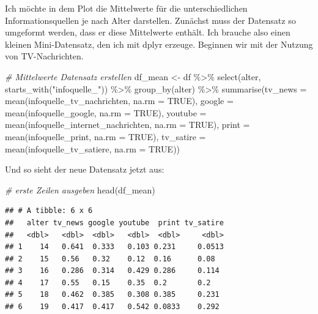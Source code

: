 \documentclass[
]{book}
\newenvironment{Shaded}{\begin{snugshade}}{\end{snugshade}}
\newcommand{\AttributeTok}[1]{\textcolor[rgb]{0.77,0.63,0.00}{#1}}
\newcommand{\CommentTok}[1]{\textcolor[rgb]{0.56,0.35,0.01}{\textit{#1}}}
\newcommand{\ConstantTok}[1]{\textcolor[rgb]{0.00,0.00,0.00}{#1}}
\newcommand{\FunctionTok}[1]{\textcolor[rgb]{0.00,0.00,0.00}{#1}}
\newcommand{\NormalTok}[1]{#1}
\newcommand{\OtherTok}[1]{\textcolor[rgb]{0.56,0.35,0.01}{#1}}
\newcommand{\SpecialCharTok}[1]{\textcolor[rgb]{0.00,0.00,0.00}{#1}}
\newcommand{\StringTok}[1]{\textcolor[rgb]{0.31,0.60,0.02}{#1}}
\begin{document}
Ich möchte in dem Plot die Mittelwerte für die unterschiedlichen Informationsquellen je nach Alter darstellen. Zunächst muss der Datensatz so umgeformt werden, dass er diese Mittelwerte enthält. Ich brauche also einen kleinen Mini-Datensatz, den ich mit dplyr erzeuge.
Beginnen wir mit der Nutzung von TV-Nachrichten.

\begin{Shaded}
\begin{Highlighting}[]
\CommentTok{\# Mittelwerte Datensatz erstellen}
\NormalTok{df\_mean }\OtherTok{\textless{}{-}}\NormalTok{ df }\SpecialCharTok{\%\textgreater{}\%} 
  \FunctionTok{select}\NormalTok{(alter, }\FunctionTok{starts\_with}\NormalTok{(}\StringTok{"infoquelle\_"}\NormalTok{)) }\SpecialCharTok{\%\textgreater{}\%} 
  \FunctionTok{group\_by}\NormalTok{(alter) }\SpecialCharTok{\%\textgreater{}\%} 
  \FunctionTok{summarise}\NormalTok{(}\AttributeTok{tv\_news =} \FunctionTok{mean}\NormalTok{(infoquelle\_tv\_nachrichten, }\AttributeTok{na.rm =} \ConstantTok{TRUE}\NormalTok{),}
            \AttributeTok{google =} \FunctionTok{mean}\NormalTok{(infoquelle\_google, }\AttributeTok{na.rm =} \ConstantTok{TRUE}\NormalTok{),}
            \AttributeTok{youtube =} \FunctionTok{mean}\NormalTok{(infoquelle\_internet\_nachrichten, }\AttributeTok{na.rm =} \ConstantTok{TRUE}\NormalTok{),}
            \AttributeTok{print =} \FunctionTok{mean}\NormalTok{(infoquelle\_print, }\AttributeTok{na.rm =} \ConstantTok{TRUE}\NormalTok{),}
            \AttributeTok{tv\_satire =} \FunctionTok{mean}\NormalTok{(infoquelle\_tv\_satiere, }\AttributeTok{na.rm =} \ConstantTok{TRUE}\NormalTok{)) }
\end{Highlighting}
\end{Shaded}

Und so sieht der neue Datensatz jetzt aus:

\begin{Shaded}
\begin{Highlighting}[]
\CommentTok{\# erste Zeilen ausgeben}
\FunctionTok{head}\NormalTok{(df\_mean)}
\end{Highlighting}
\end{Shaded}

\begin{verbatim}
## # A tibble: 6 x 6
##   alter tv_news google youtube  print tv_satire
##   <dbl>   <dbl>  <dbl>   <dbl>  <dbl>     <dbl>
## 1    14   0.641  0.333   0.103 0.231     0.0513
## 2    15   0.56   0.32    0.12  0.16      0.08  
## 3    16   0.286  0.314   0.429 0.286     0.114 
## 4    17   0.55   0.15    0.35  0.2       0.2   
## 5    18   0.462  0.385   0.308 0.385     0.231 
## 6    19   0.417  0.417   0.542 0.0833    0.292
\end{verbatim}
\end{document}
